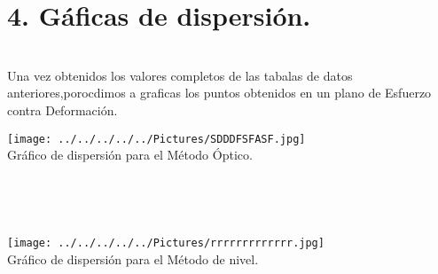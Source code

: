\documentclass[10pt,a4paper]{article}
\begin{document}
\medskip
\section*{4. G\'{a}ficas de dispersi\'{o}n.}
\\
Una vez obtenidos los valores completos de las tabalas de datos anteriores,porocdimos a graficas los puntos obtenidos en un plano de Esfuerzo contra Deformaci\'{o}n.
\\
\begin{figure 4}
\centering
\texttt{[image: ../../../../../Pictures/SDDDFSFASF.jpg]} 
\\
\caption{Gr\'{a}fico de dispersi\'{o}n para el M\'{e}todo \'{O}ptico.}
\\
\end{figure 4}
\\
\begin{figure 5}
\centering
\texttt{[image: ../../../../../Pictures/rrrrrrrrrrrrr.jpg]} 
\\
\caption{Gr\'{a}fico de dispersi\'{o}n para el M\'{e}todo de nivel.}
\\
\end{figure 5}

\pagebreak
\end{document}
